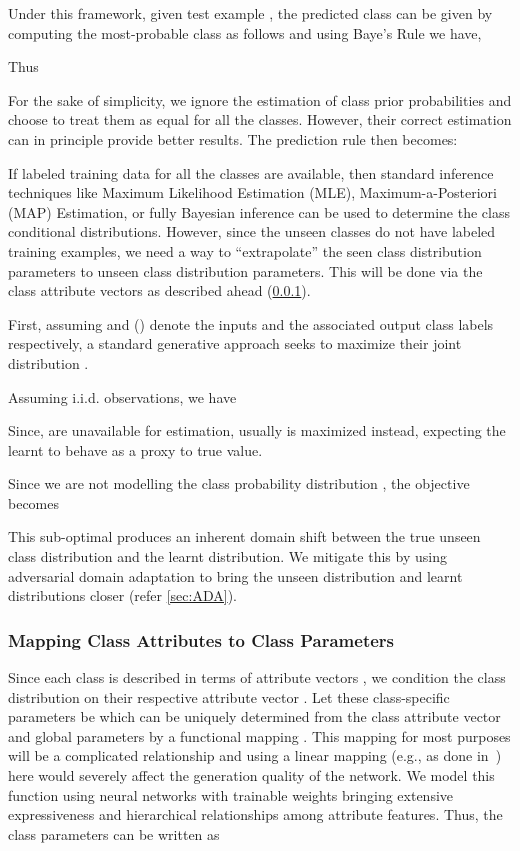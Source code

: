 \documentclass[10pt,twocolumn,letterpaper]{article}
\begin{document}
Under this framework, given test example , the predicted class  can be given by computing the most-probable class as follows
 and using Baye's Rule we have,

Thus


For the sake of simplicity, we ignore the estimation of class prior probabilities and choose to treat them as equal for all the classes. However, their correct estimation can in principle provide better results. The prediction rule then becomes:

If labeled training data for all the classes are available, then standard inference techniques like Maximum Likelihood Estimation (MLE), Maximum-a-Posteriori (MAP) Estimation, or fully Bayesian inference can be used to determine the class conditional distributions. However, since the unseen classes do not have labeled training examples, we need a way to ``extrapolate'' the seen class distribution parameters to unseen class distribution parameters. This will be done via the class attribute vectors as described ahead (\ref{sec:attmapping}). 

First, assuming  and  () denote the inputs and the associated output class labels respectively, a standard generative approach seeks to  maximize their joint distribution .

Assuming i.i.d. observations, we have

Since,  are unavailable for  estimation, 
usually  is maximized instead, expecting the learnt  to behave as a proxy to true value.


Since we are not modelling the class probability distribution , the objective becomes


This sub-optimal  produces an inherent domain shift between the true unseen class distribution and the learnt distribution. We mitigate this by using adversarial domain adaptation to bring the unseen distribution and learnt distributions closer (refer \ref{sec:ADA}).

\subsubsection{Mapping Class Attributes to Class Parameters}
\label{sec:attmapping}
Since each class is described in terms of attribute vectors , we condition the class distribution on their respective attribute vector . Let these class-specific parameters be  which can be uniquely determined from the class attribute vector  and global parameters  by a functional mapping . This mapping for most purposes will be a complicated relationship and using a linear mapping (e.g., as done in~\cite{verma2017simple}) here would severely affect the generation quality of the network. We model this function  using neural networks with trainable weights   bringing extensive expressiveness and hierarchical relationships among attribute features. Thus, the class parameters can be written as  
\end{document}
